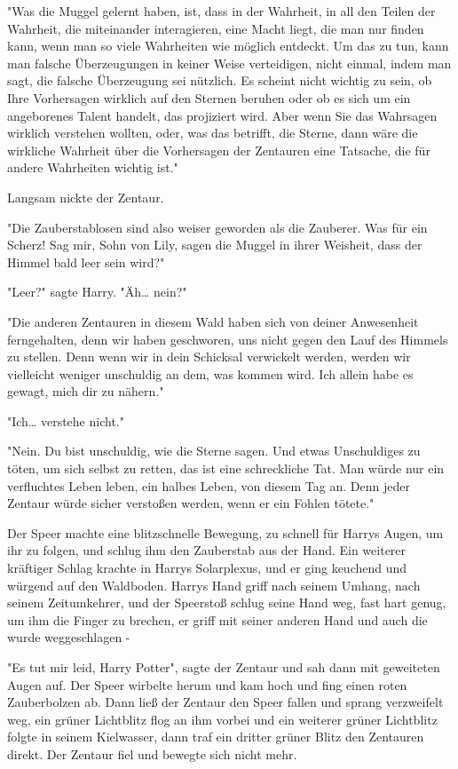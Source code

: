 {"Was die Muggel gelernt haben, ist, dass in der Wahrheit, in all den Teilen der Wahrheit, die miteinander interagieren, eine Macht liegt, die man nur finden kann, wenn man so viele Wahrheiten wie möglich entdeckt. Um das zu tun, kann man falsche Überzeugungen in keiner Weise verteidigen, nicht einmal, indem man sagt, die falsche Überzeugung sei nützlich. Es scheint nicht wichtig zu sein, ob Ihre Vorhersagen wirklich auf den Sternen beruhen oder ob es sich um ein angeborenes Talent handelt, das projiziert wird. Aber wenn Sie das Wahrsagen wirklich verstehen wollten, oder, was das betrifft, die Sterne, dann wäre die wirkliche Wahrheit über die Vorhersagen der Zentauren eine Tatsache, die für andere Wahrheiten wichtig ist."

Langsam nickte der Zentaur.

"Die Zauberstablosen sind also weiser geworden als die Zauberer. Was für ein Scherz! Sag mir, Sohn von Lily, sagen die Muggel in ihrer Weisheit, dass der Himmel bald leer sein wird?"

"Leer?" sagte Harry. "Äh… nein?"

"Die anderen Zentauren in diesem Wald haben sich von deiner Anwesenheit ferngehalten, denn wir haben geschworen, uns nicht gegen den Lauf des Himmels zu stellen. Denn wenn wir in dein Schicksal verwickelt werden, werden wir vielleicht weniger unschuldig an dem, was kommen wird. Ich allein habe es gewagt, mich dir zu nähern."

"Ich… verstehe nicht."

"Nein. Du bist unschuldig, wie die Sterne sagen. Und etwas Unschuldiges zu töten, um sich selbst zu retten, das ist eine schreckliche Tat. Man würde nur ein verfluchtes Leben leben, ein halbes Leben, von diesem Tag an. Denn jeder Zentaur würde sicher verstoßen werden, wenn er ein Fohlen tötete."

Der Speer machte eine blitzschnelle Bewegung, zu schnell für Harrys Augen, um ihr zu folgen, und schlug ihm den Zauberstab aus der Hand. Ein weiterer kräftiger Schlag krachte in Harrys Solarplexus, und er ging keuchend und würgend auf den Waldboden. Harrys Hand griff nach seinem Umhang, nach seinem Zeitumkehrer, und der Speerstoß schlug seine Hand weg, fast hart genug, um ihm die Finger zu brechen, er griff mit seiner anderen Hand und auch die wurde weggeschlagen -

"Es tut mir leid, Harry Potter", sagte der Zentaur und sah dann mit geweiteten Augen auf. Der Speer wirbelte herum und kam hoch und fing einen roten Zauberbolzen ab. Dann ließ der Zentaur den Speer fallen und sprang verzweifelt weg, ein grüner Lichtblitz flog an ihm vorbei und ein weiterer grüner Lichtblitz folgte in seinem Kielwasser, dann traf ein dritter grüner Blitz den Zentauren direkt. Der Zentaur fiel und bewegte sich nicht mehr.

}
